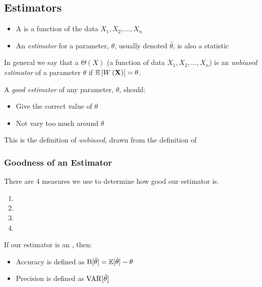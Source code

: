 \subsection{Estimators}\label{subsec:Estimators}
\begin{itemize}[noitemsep, nolistsep]
\item A  is a function of the data $X_{1},X_{2},\ldots,X_{n}$
\item An \emph{estimator} for a parameter, $\theta$, usually denoted $\hat{\theta}$, is also a statistic
\end{itemize}
\begin{definition}\label{def:Unbiased Estimator}
  In general we say that a  $\Theta (X)$ (a function of data $X_{1},X_{2},\ldots,X_{n}$) is an \emph{unbiased estimator} of a parameter $\theta$ if $\operatorname{\operatorname{\mathbb{E}}} \left[ W \left( \mathbf{X} \right) \right] = \theta$.
  \begin{remark}
    A \emph{good estimator} of any parameter, $\theta$, should:
    \begin{itemize}[noitemsep, nolistsep]
    \item Give the correct value of $\theta$
    \item Not vary too much around $\theta$
    \end{itemize}
  \end{remark}
  \begin{remark}
    This is the definition of \emph{unbiased}, drawn from the definition of 
  \end{remark}
\end{definition}

\subsubsection{Goodness of an Estimator}\label{subsubsec:Estimator Goodness}
There are 4 measures we use to determine how good our estimator is.
\begin{enumerate}
\item {}
\item {}
\item {}
\item {}
\end{enumerate}
If our estimator is an , then:
\begin{itemize}
\item Accuracy is defined as $\operatorname{\operatorname{B}} [\hat{\theta} ] = \operatorname{\operatorname{\mathbb{E}}} [\hat{\theta}] - \theta$
\item Precision is defined as $\operatorname{\operatorname{VAR}} [\hat{\theta}]$
\end{itemize}

